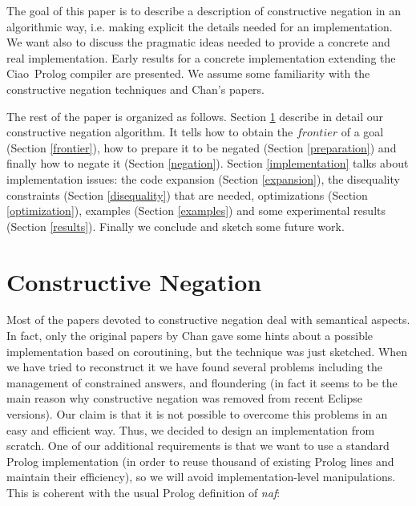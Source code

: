 \documentclass{llncs}
\newcommand{\naf}{{\em naf}}\newcommand{\viejo}[1]{}
\newcommand{\ciao}{Ciao}
\begin{document}
The goal of this paper is to describe a description of constructive negation
in an algorithmic way, i.e. making explicit the details needed for an 
implementation. We want also to discuss the pragmatic ideas needed to
provide a concrete and real implementation. Early results for a concrete 
implementation extending the \ciao\ Prolog compiler are presented.
We assume some familiarity with the constructive negation techniques and
Chan's papers.

The rest of the paper is organized as follows. Section
\ref{constructive} describe in detail our constructive negation
algorithm. It tells how to obtain the $frontier$ of a goal (Section
\ref{frontier}), how to prepare it to be negated (Section
\ref{preparation}) and finally how to negate it (Section
\ref{negation}). Section \ref{implementation} talks about
implementation issues: the code expansion (Section \ref{expansion}),
the disequality constraints (Section \ref{disequality}) that are
needed, optimizations (Section \ref{optimization}), examples (Section
\ref{examples}) and some experimental results (Section \ref{results}).
Finally we conclude and sketch some future work.
 


\section{Constructive Negation}
\label{constructive}

Most of the papers devoted to constructive negation deal with
semantical aspects. In fact, only the original papers by Chan gave
some hints about a possible implementation based on coroutining, but
the technique was just sketched. When we have tried to reconstruct it
we have found several problems including the management of constrained
answers, and floundering (in fact it seems to be the main reason why
constructive negation was removed from recent Eclipse versions).  Our
claim is that it is not possible to overcome this problems in an easy
and efficient way.  Thus, we decided to design an implementation from
scratch.  One of our additional requirements is that we want to use a
standard Prolog implementation (in order to reuse thousand of existing
Prolog lines and maintain their efficiency), so we will avoid
implementation-level manipulations. This is coherent with the usual
Prolog definition of \naf:
\end{document}
